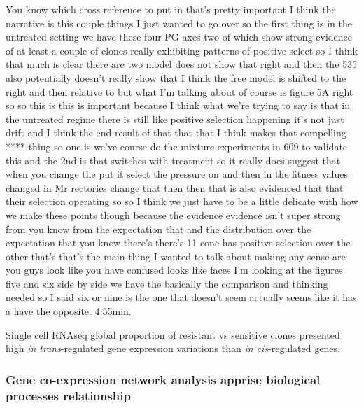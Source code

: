 You know which cross reference to put in that's pretty important I think the narrative is this couple things I just wanted to go over so the first thing is in the untreated setting we have these four PG axes two of which show strong evidence of at least a couple of clones really exhibiting patterns of positive select so I think that much is clear there are two model does not show that right and then the 535 also potentially doesn't really show that I think the free model is shifted to the right and then relative to but what I'm talking about of course is figure 5A right so so this is this is important because I think what we're trying to say is that in the untreated regime there is still like positive selection happening it's not just drift and I think the end result of that that that I think makes that compelling **** thing so one is we've course do the mixture experiments in 609 to validate this and the 2nd is that switches with treatment so it really does suggest that when you change the put it select the pressure on and then in the fitness values changed in Mr rectories change that then then that is also evidenced that that their selection operating so so I think we just have to be a little delicate with how we make these points though because the evidence evidence isn't super strong from you know from the expectation that and the distribution over the expectation that you know there's there's 11 cone has positive selection over the other that's that's the main thing I wanted to talk about making any sense are you guys look like you have confused looks like faces I'm looking at the figures five and six side by side we have the basically the comparison and thinking needed so I said six or nine is the one that doesn't seem actually seems like it has a have the opposite. 4.55min.


{Single cell RNAseq global proportion of resistant vs sensitive clones presented high \textit{in trans}-regulated gene expression variations than \textit{in cis}-regulated genes.}

\subsubsection{Gene co-expression network analysis apprise biological processes relationship}

